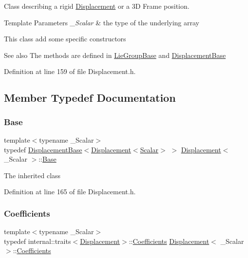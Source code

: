 Class describing a rigid \hyperlink{class_displacement}{Displacement} or a 3D Frame position. 


\begin{DoxyTemplParams}{Template Parameters}
{\em \+\_\+\+Scalar} & the type of the underlying array\\
\hline
\end{DoxyTemplParams}
This class add some specific constructors

\begin{DoxySeeAlso}{See also}
The methods are defined in \hyperlink{class_lie_group_base}{Lie\+Group\+Base} and \hyperlink{class_displacement_base}{Displacement\+Base} 
\end{DoxySeeAlso}


Definition at line 159 of file Displacement.\+h.



\subsection{Member Typedef Documentation}
\hypertarget{class_displacement_acdd707b0e59e9f846d6c116fc8c88408}{}\label{class_displacement_acdd707b0e59e9f846d6c116fc8c88408} 
\subsubsection{\texorpdfstring{Base}{Base}}
{\footnotesize\ttfamily template$<$typename \+\_\+\+Scalar$>$ \\
typedef \hyperlink{class_displacement_base}{Displacement\+Base}$<$\hyperlink{class_displacement}{Displacement}$<$\hyperlink{class_displacement_ade979a89a65e3b67dea322a0cef92c88}{Scalar}$>$ $>$ \hyperlink{class_displacement}{Displacement}$<$ \+\_\+\+Scalar $>$\+::\hyperlink{class_displacement_acdd707b0e59e9f846d6c116fc8c88408}{Base}\hspace{0.3cm}{\ttfamily [protected]}}

The inherited class 

Definition at line 165 of file Displacement.\+h.

\hypertarget{class_displacement_a995adefd20afdb476cdef2aa7bbc4531}{}\label{class_displacement_a995adefd20afdb476cdef2aa7bbc4531} 
\subsubsection{\texorpdfstring{Coefficients}{Coefficients}}
{\footnotesize\ttfamily template$<$typename \+\_\+\+Scalar$>$ \\
typedef internal\+::traits$<$\hyperlink{class_displacement}{Displacement}$>$\+::\hyperlink{class_displacement_a995adefd20afdb476cdef2aa7bbc4531}{Coefficients} \hyperlink{class_displacement}{Displacement}$<$ \+\_\+\+Scalar $>$\+::\hyperlink{class_displacement_a995adefd20afdb476cdef2aa7bbc4531}{Coefficients}}

